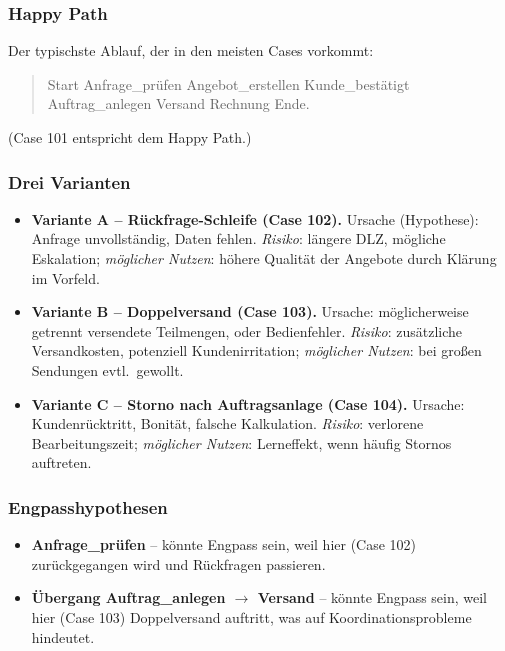 \documentclass[11pt,a4paper,oneside]{article}
\newcommand{\fachbegriff}[1]{\textbf{#1}}
\begin{document}
\subsubsection{Happy Path}

Der typischste Ablauf, der in den meisten Cases vorkommt:
\begin{quote}
Start \textrightarrow{} Anfrage\_prüfen \textrightarrow{} Angebot\_erstellen \textrightarrow{} Kunde\_bestätigt \textrightarrow{} Auftrag\_anlegen \textrightarrow{} Versand \textrightarrow{} Rechnung \textrightarrow{} Ende.
\end{quote}

(Case 101 entspricht dem Happy Path.)

\subsubsection{Drei Varianten}

\begin{itemize}
  \item \textbf{Variante A -- Rückfrage-Schleife (Case 102).} Ursache (Hypothese): Anfrage unvollständig, Daten fehlen. \emph{Risiko}: längere DLZ, mögliche Eskalation; \emph{möglicher Nutzen}: höhere Qualität der Angebote durch Klärung im Vorfeld.
  \item \textbf{Variante B -- Doppelversand (Case 103).} Ursache: möglicherweise getrennt versendete Teilmengen, oder Bedienfehler. \emph{Risiko}: zusätzliche Versandkosten, potenziell Kundenirritation; \emph{möglicher Nutzen}: bei großen Sendungen evtl.\ gewollt.
  \item \textbf{Variante C -- Storno nach Auftragsanlage (Case 104).} Ursache: Kundenrücktritt, Bonität, falsche Kalkulation. \emph{Risiko}: verlorene Bearbeitungszeit; \emph{möglicher Nutzen}: Lerneffekt, wenn häufig Stornos auftreten.
\end{itemize}

\subsubsection{Engpasshypothesen}

\begin{itemize}
  \item \fachbegriff{Anfrage\_prüfen} -- könnte Engpass sein, weil hier (Case 102) zurückgegangen wird und Rückfragen passieren.
  \item \fachbegriff{Übergang Auftrag\_anlegen $\rightarrow$ Versand} -- könnte Engpass sein, weil hier (Case 103) Doppelversand auftritt, was auf Koordinations\-probleme hindeutet.
\end{itemize}
\end{document}
